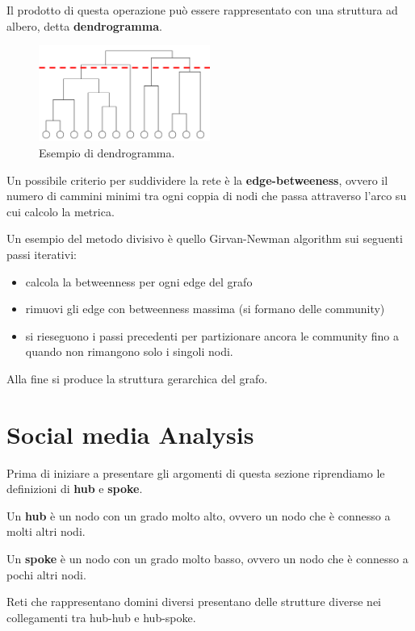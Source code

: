 Il prodotto di questa operazione può essere rappresentato con una struttura ad
albero, detta \textbf{dendrogramma}.
\begin{figure}[!ht]
    \centering
    \includegraphics[width=0.5\textwidth]{./img/net/dendrogram.png}
    \caption{Esempio di dendrogramma.}
    \label{fig:dendrogram}
\end{figure}

Un possibile criterio per suddividere la rete è la \textbf{edge-betweeness}, ovvero
il numero di cammini minimi tra ogni coppia di nodi che passa attraverso l'arco
su cui calcolo la metrica.

Un esempio del metodo divisivo è quello Girvan-Newman algorithm sui seguenti passi 
iterativi:
\begin{itemize}
    \item calcola la betweenness per ogni edge del grafo
    \item rimuovi gli edge con betweenness massima (si formano delle community)
    \item si rieseguono i passi precedenti per partizionare ancora le community fino a quando non rimangono 
    solo i singoli nodi.
\end{itemize}
Alla fine si produce la struttura gerarchica del grafo.

\section{Social media Analysis}
Prima di iniziare a presentare gli argomenti di questa sezione riprendiamo
le definizioni di \textbf{hub} e \textbf{spoke}.
\begin{definizione}
    Un \textbf{hub} è un nodo con un grado molto alto, ovvero un nodo che è
    connesso a molti altri nodi.
\end{definizione}
\begin{definizione}
    Un \textbf{spoke} è un nodo con un grado molto basso, ovvero un nodo che è
    connesso a pochi altri nodi.
\end{definizione}
Reti che rappresentano domini diversi presentano delle strutture diverse nei
collegamenti tra hub-hub e hub-spoke.

